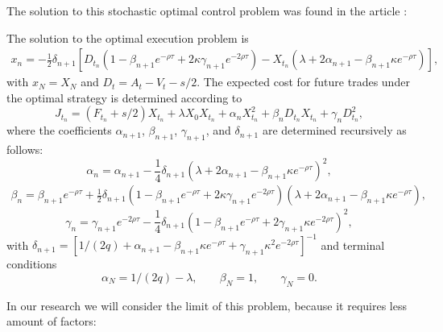 The solution to this stochastic optimal control problem was found in the article \cite{obizhaeva2013optimal}:
\begin{theorem}
    The solution to the optimal execution problem is
    \begin{multline*}
        x_n = - \frac{1}{2} \delta_{n + 1} [D_{t_n} (1 - \beta_{n + 1} e^{ - \rho \tau} + 2 \kappa \gamma_{n+1} e^{ - 2 \rho \tau}) 
         - X_{t_n} (\lambda + 2 \alpha_{n+1} - \beta_{n+1}\kappa e^{ - \rho \tau}) ], 
    \end{multline*}
    with $x_N = X_N$ and $D_t = A_t - V_t - s/2$. The expected cost for future trades under the optimal
    strategy is determined according to
    \begin{equation*}
        J_{t_n} = (F_{t_n} + s/2) X_{t_n} + \lambda X_0 X_{t_n} + \alpha_n X_{t_n} ^2 + \beta_{n} D_{t_n} X_{t_n} + \gamma_n D_{t_n}^2, 
    \end{equation*}
    where the coefficients $\alpha_{n+1}$, $\beta_{n+1}$, $\gamma_{n+1}$, and $\delta_{n+1}$ are determined recursively as follows:
    \begin{equation*}
        \alpha_{n} = \alpha_{n+1} - \frac{1}{4} \delta _{n+1} (\lambda + 2 \alpha_{n+1} - \beta_{n+1} \kappa e^{- \rho \tau})^2, 
    \end{equation*}
    \begin{multline*}
        \beta_{n} =  \beta_{n+1} e^{- \rho \tau} + \frac{1}{2} \delta _{n+1} (1 - \beta_{n+1} e^{- \rho \tau} 
         + 2 \kappa \gamma_{n+1} e^{- 2 \rho \tau}) (\lambda + 2 \alpha_{n+1} - \beta_{n+1} \kappa e^{-\rho \tau}), 
    \end{multline*}
    \begin{equation*}
         \gamma_n =   \gamma_{n+1} e^{- 2 \rho \tau} - \frac{1}{4} \delta _{n+1} (1 - \beta _{n+1} e^{- \rho \tau} 
    + 2 \gamma _{n+1} \kappa e^{- 2 \rho \tau})^2, 
    \end{equation*}
    with $\delta_{n+1} = [1/(2q) + \alpha_{n+1} - \beta_{n+1} \kappa e^{-\rho \tau} + \gamma _{n+1} \kappa ^2 e^{- 2 \rho \tau}]^{-1}$ and terminal conditions
    \begin{equation*}
        \alpha_{N} = 1/(2q) - \lambda, \;\;\;\;\;\;\; \beta_N = 1, \;\;\;\;\;\;\; \gamma_N = 0.
    \end{equation*}
\end{theorem}

In our research we will consider the limit of this problem, because it requires less amount of factors:

